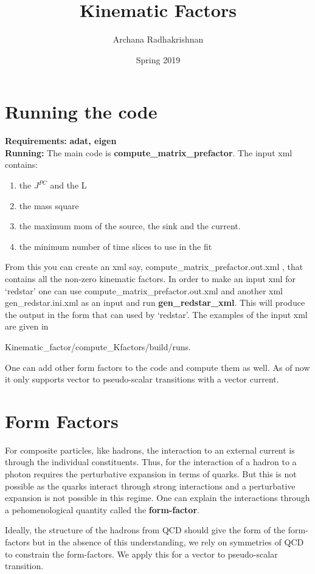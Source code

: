 \documentclass[10pt]{article}
\title{Kinematic Factors}
\author{Archana Radhakrishnan}
\date{Spring 2019}
\begin{document}
\maketitle



\section{Running the code} 
\textbf{Requirements:} \textbf{{\myfont adat, eigen}}\\
\textbf{Running:} The main code is \textbf{{\myfont compute_matrix_prefactor}}. The input xml contains:
\begin{enumerate}
 \item the $J^{PC}$ and the L
 \item the mass square
 \item the maximum mom 
 of the source, the sink and the current.
 \item the minimum number of time slices to use in the fit
\end{enumerate}
From this you can create an xml say, {\myfont compute_matrix_prefactor.out.xml} ,  that contains all the non-zero kinematic factors. In order to make an input xml for `redstar' one can use {\myfont compute_matrix_prefactor.out.xml} and another xml {\myfont gen_redstar.ini.xml} as an input and run \textbf{{\myfont gen_redstar_xml}}. This will produce the output in the form that can used by `redstar'. The examples of the input xml are given in 

\begin{center}
{\myfont Kinematic_factor/compute_Kfactors/build/runs}. 
\end{center}

\par
One can add other form factors to the code and compute them as well. As of now it only supports vector to pseudo-scalar transitions with a vector current.
\section{Form Factors} 
For composite particles, like hadrons, the interaction to an external current is through the individual constituents. Thus, for the interaction of a hadron to a photon requires the perturbative expansion in terms of quarks. But this is not possible as the quarks interact through strong interactions and a perturbative expansion is not possible in this regime. One can explain the interactions through a pehomenological quantity called the \textbf{form-factor}.\par
Ideally, the structure of the hadrons from QCD should give the form of the form-factors but in the absence of this understanding, we rely on symmetries of QCD to constrain the form-factors. We apply this for a vector to pseudo-scalar transition. \par
\end{document}
